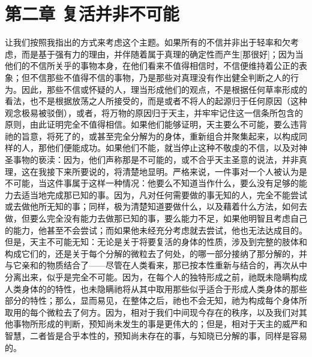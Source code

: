 
\section{第二章 复活并非不可能}

让我们按照我指出的方式来考虑这个主题。如果所有的不信并非出于轻率和欠考虑，而是基于强有力的理由，并伴随着属于真理的确定性而产生[那很好]；因为当他们的不信所关乎的事物本身，在他们看来不值得相信时，不信便维持着公正的表象；但不信那些不值得不信的事物，乃是那些对真理没有作出健全判断之人的行为。因此，那些不信或怀疑的人，理当形成他们的观点，不是根据任何草率形成的看法，也不是根据放荡之人所接受的，而是或者不将人的起源归于任何原因（这种观念极易被驳倒），或者，将万物的原因归于天主，并牢牢记住这一信条所包含的原则，由此证明完全不值得相信。如果他们能够证明，天主要么不可能，要么违背祂的旨意，将死了的，或甚至完全分解为的身体，重新组合并聚集起来，以构成同样的人，那他们便能成功。如果他们不能，就当停止这种不敬虔的不信，以及对神圣事物的亵渎：因为，他们声称那是不可能的，或不合乎天主圣意的说法，并非真理，这在我接下来所要说的，将清楚地显明。严格来说，一件事对一个人被认为是不可能，当这件事属于这样一种情况：他要么不知道当作什么，要么没有足够的能力去适当地完成那已知的事。因为，凡对任何需要做的事无知的人，完全不能尝试或去做他所无知的事；同样，极为清楚知道要做什么，以及藉着什么方法，如何去做，但要么完全没有能力去做那已知的事，要么能力不足，如果他明智且考虑自己的能力，他甚至不会尝试；而如果他未经充分考虑就去尝试，他也无法达成目的。但是，天主不可能无知：无论是关于将要复活的身体的性质，涉及到完整的肢体和构成它们的，还是关于每个分解的微粒去了何处，的哪一部分接纳了那分解的，并与它亲和的物质结合了——尽管在人类看来，那已按本性重新与结合的，再次从中分离出来，似乎是完全不可能。因为，在每个人的独特形成之前，祂既未隐瞒构成人类身体的的特性，也未隐瞒祂将从其中取用那些似乎适合于形成人类身体的那些部分的特性；那么，显而易见，在整体之后，祂也不会无知，祂为构成每个身体所取用的每个微粒去了何方。因为，相对于我们中间现今存在的秩序，以及我们对其他事物所形成的判断，预知尚未发生的事是更伟大的；但是，相对于天主的威严和智慧，二者皆是合乎本性的，预知尚未存在的事，与知晓已分解的事，同样是容易的。\par


